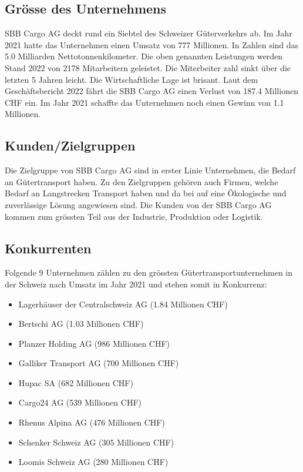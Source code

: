 \documentclass{article}
\begin{document}
\subsection{Grösse des Unternehmens }

SBB Cargo AG deckt rund ein Siebtel des Schweizer Güterverkehrs ab.
Im Jahr 2021 hatte das Unternehmen einen Umsatz von 777 Millionen.
In Zahlen sind das 5.0 Milliarden Nettotonnenkilometer.
Die oben genannten Leistungen werden Stand 2022 von 2178 Mitarbeitern geleistet.
Die Miterbeiter zahl sinkt über die letzten 5 Jahren leicht.
Die Wirtschaftliche Lage ist brisant.
Laut dem Geschäftsbericht 2022 fährt die SBB Cargo AG einen Verlust von 187.4 Millionen CHF ein.
Im Jahr 2021 schaffte das Unternehmen noch einen Gewinn von 1.1 Millionen. 

\subsection{Kunden/Zielgruppen}

Die Zielgruppe von SBB Cargo AG sind in erster Linie Unternehmen, die Bedarf an Gütertransport haben.
Zu den Zielgruppen gehören auch Firmen, welche Bedarf an Langstrecken Transport haben und da bei auf eine Ökologische und zuverlässige Lösung angewiesen sind.
Die Kunden von der SBB Cargo AG kommen zum grössten Teil aus der Industrie, Produktion oder Logistik.

\subsection{Konkurrenten}
Folgende 9 Unternehmen zählen zu den grössten Gütertransportunternehmen in der Schweiz nach Umsatz im Jahr 2021 und stehen somit in Konkurrenz:
\begin{itemize}
\item Lagerhäuser der Centralschweiz AG (1.84 Millionen CHF)
\item Bertschi AG (1.03 Millionen CHF)
\item Planzer Holding AG (986 Millionen CHF)
\item Galliker Transport AG (700 Millionen CHF)
\item Hupac SA (682 Millionen CHF)
\item Cargo24 AG (539 Millionen CHF)
\item Rhenus Alpina AG (476 Millionen CHF)
\item Schenker Schweiz AG (305 Millionen CHF)
\item Loomis Schweiz AG (280 Millionen CHF)
\end{itemize}
\end{document}
